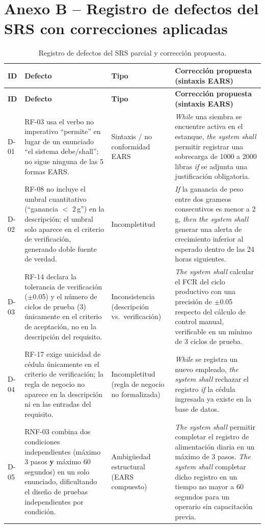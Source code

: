 \documentclass[11pt,a4paper]{report}
\begin{document}
\section*{Anexo B -- Registro de defectos del SRS con correcciones aplicadas}
{\footnotesize
\begin{longtable}{L{1.3cm}L{4.3cm}L{2.2cm}L{6.8cm}}
\caption{Registro de defectos del SRS parcial y correcci\'on propuesta.}\label{tab:defectos}\\
\toprule
\textbf{ID} & \textbf{Defecto} & \textbf{Tipo} & \textbf{Correcci\'on propuesta (sintaxis EARS)} \\
\midrule
\endfirsthead
\toprule
\textbf{ID} & \textbf{Defecto} & \textbf{Tipo} & \textbf{Correcci\'on propuesta (sintaxis EARS)} \\
\midrule
\endhead
\bottomrule
\endfoot
D-01 & RF-03 usa el verbo no imperativo ``permite'' en lugar de un enunciado ``el sistema debe/shall''; no sigue ninguna de las 5 formas EARS. & Sintaxis / no conformidad EARS & \emph{While} una siembra se encuentre activa en el estanque, \emph{the system shall} permitir registrar una sobrecarga de 1000 a 2000 libras \emph{if} se adjunta una justificaci\'on obligatoria. \\
D-02 & RF-08 no incluye el umbral cuantitativo (``ganancia $<$ 2\,g'') en la descripci\'on; el umbral solo aparece en el criterio de verificaci\'on, generando doble fuente de verdad. & Incompletitud & \emph{If} la ganancia de peso entre dos grameos consecutivos es menor a 2\,g, \emph{then the system shall} generar una alerta de crecimiento inferior al esperado dentro de las 24 horas siguientes. \\
D-03 & RF-14 declara la tolerancia de verificación ($\pm$0.05) y el número de ciclos de prueba (3) únicamente en el criterio de aceptación, no en la descripci\'on del requisito. & Inconsistencia (descripción vs.\ verificación) & \emph{The system shall} calcular el FCR del ciclo productivo con una precisión de $\pm$0.05 respecto del cálculo de control manual, verificable en un mínimo de 3 ciclos de prueba. \\
D-04 & RF-17 exige unicidad de cédula únicamente en el criterio de verificación; la regla de negocio no aparece en la descripci\'on ni en las entradas del requisito. & Incompletitud (regla de negocio no formalizada) & \emph{While} se registra un nuevo empleado, \emph{the system shall} rechazar el registro \emph{if} la c\'edula ingresada ya existe en la base de datos. \\
D-05 & RNF-03 combina dos condiciones independientes (m\'aximo 3 pasos \textbf{y} máximo 60 segundos) en un solo enunciado, dificultando el dise\~no de pruebas independientes por condición. & Ambig\"uedad estructural (EARS compuesto) & \emph{The system shall} permitir completar el registro de alimentaci\'on diaria en un máximo de 3 pasos. \emph{The system shall} completar dicho registro en un tiempo no mayor a 60 segundos para un operario sin capacitaci\'on previa. \\

\end{longtable}}
\end{document}
